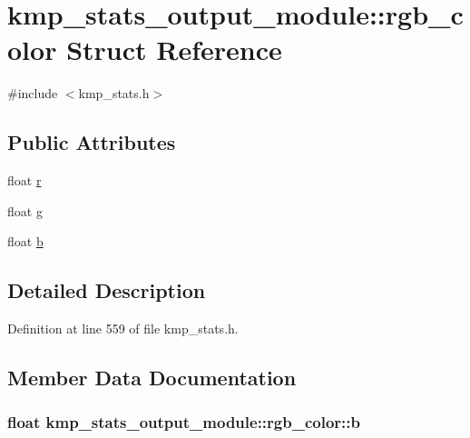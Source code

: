 \hypertarget{structkmp__stats__output__module_1_1rgb__color}{\section{kmp\-\_\-stats\-\_\-output\-\_\-module\-:\-:rgb\-\_\-color Struct Reference}
\label{structkmp__stats__output__module_1_1rgb__color}
}


{\ttfamily \#include $<$kmp\-\_\-stats.\-h$>$}

\subsection*{Public Attributes}
\begin{DoxyCompactItemize}
\item 
float \hyperlink{structkmp__stats__output__module_1_1rgb__color_af0da06f47d8354186744158fbd406733}{r}
\item 
float \hyperlink{structkmp__stats__output__module_1_1rgb__color_a655d2c8f77d84a19aaf715f2751abd3d}{g}
\item 
float \hyperlink{structkmp__stats__output__module_1_1rgb__color_a4e0867bcf2840f7c99b3d55c7e108cdd}{b}
\end{DoxyCompactItemize}


\subsection{Detailed Description}


Definition at line 559 of file kmp\-\_\-stats.\-h.



\subsection{Member Data Documentation}
\hypertarget{structkmp__stats__output__module_1_1rgb__color_a4e0867bcf2840f7c99b3d55c7e108cdd}{
\subsubsection[{b}]{\setlength{\rightskip}{0pt plus 5cm}float kmp\-\_\-stats\-\_\-output\-\_\-module\-::rgb\-\_\-color\-::b}}\label{structkmp__stats__output__module_1_1rgb__color_a4e0867bcf2840f7c99b3d55c7e108cdd}


